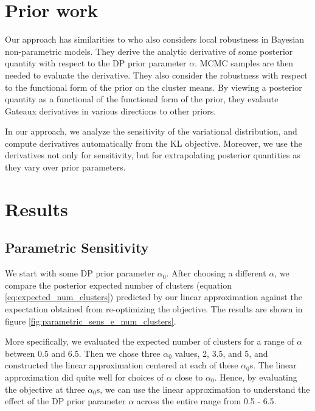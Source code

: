 \documentclass{article}
\begin{document}
\section{Prior work}
%
Our approach has similarities to \citet{Basu:2000:BNP_robustness} who also
considers local robustness in Bayesian non-parametric models. They derive the
analytic derivative of some posterior quantity with respect to the DP prior
parameter $\alpha$. MCMC samples are then needed to evaluate the derivative.
They also consider the robustness with respect to the functional form of the
prior on the cluster means.  By viewing a posterior quantity as a functional of
the functional form of the prior, they evalaute Gateaux derivatives in various
directions to other priors.

In our approach, we analyze the sensitivity of the variational distribution, and
compute derivatives automatically from the KL objective. Moreover, we use the
derivatives not only for sensitivity, but for extrapolating posterior quantities
as they vary over prior parameters.

\section{Results}

\subsection{Parametric Sensitivity}
%
We start with some DP prior parameter $\alpha_0$. After choosing a different
$\alpha$, we compare the posterior expected number of clusters (equation
\ref{eq:expected_num_clusters}) predicted by our linear approximation against
the expectation obtained from re-optimizing the objective. The results are shown
in figure \ref{fig:parametric_sens_e_num_clusters}.

More specifically, we evaluated the expected number of clusters for a range of
$\alpha$ between 0.5 and 6.5. Then we chose three $\alpha_0$ values, 2, 3.5, and
5, and constructed the linear approximation centered at each of these
$\alpha_0$s. The linear approximation did quite well for choices of $\alpha$
close to $\alpha_0$. Hence, by evaluating the objective at three $\alpha_0$s, we
can use the linear approximation to understand the effect of the DP prior
parameter $\alpha$ across the entire range from 0.5 - 6.5.
\end{document}
